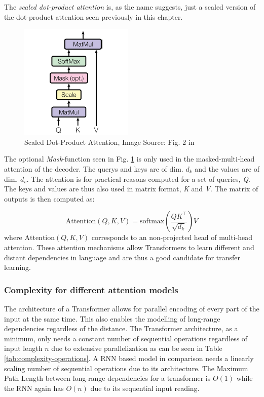 \documentclass[]{krantz}
\begin{document}
The \emph{scaled dot-product attention} is, as the name suggests, just a scaled version
of the dot-product attention seen previously in this chapter.

\begin{figure}

{\centering \includegraphics[width=0.5\linewidth]{figures/02-02-attention-and-self-attention-for-nlp/scaled-dot-prod-attention} 

}

\caption{Scaled Dot-Product Attention, Image Source: Fig. 2 in \citep{vaswani2017attention}}\label{fig:scaled-dot-prod-attention}
\end{figure}

The optional \emph{Mask}-function seen in Fig. \ref{fig:scaled-dot-prod-attention} is
only used in the masked-multi-head attention of the decoder. The querys and
keys are of dim. \(d_k\) and the values are of dim. \(d_v\). The attention
is for practical reasons computed for a set of queries, \emph{Q}. The keys and values
are thus also used in matrix format, \emph{K} and \emph{V}. The matrix of outputs is then
computed as:

\[
\text{Attention}(Q,K,V) = \text{softmax}(\frac{QK^\top}{\sqrt{d_k}})V
\]
where \(\text{Attention}(Q,K,V)\) corresponds to an non-projected head of multi-head attention.
These attention mechanisms allow Transformers to learn different and distant dependencies in language
and are thus a good candidate for transfer learning.

\hypertarget{complexity-for-different-attention-models}{%
\subsubsection{Complexity for different attention models}\label{complexity-for-different-attention-models}}

The architecture of a Transformer allows for parallel encoding of every part of the
input at the same time. This also enables the modelling of long-range dependencies regardless
of the distance.
The Transformer architecture, as a minimum, only needs a constant number of sequential operations regardless of
input length \(n\) due to extensive parallelization as can be seen in Table \ref{tab:complexity-operations}.
A RNN based model in comparison needs a linearly scaling number of sequential operations due to its architecture.
The Maximum Path Length between long-range dependencies for a transformer is \(O(1)\) while the RNN
again has \(O(n)\) due to its sequential input reading.
\end{document}
